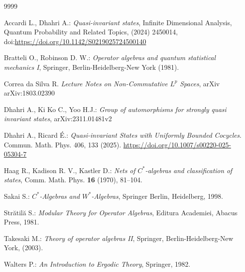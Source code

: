 \documentclass[12pt]{amsart}
\numberwithin{equation}{section}
\theoremstyle{definition}
\begin{document}
\begin{thebibliography}{9999}

 Accardi L., Dhahri A.: \emph{Quasi-invariant states}, Infinite Dimensional Analysis, Quantum Probability and Related Topics, (2024) 2450014, doi:\url{https://doi.org/10.1142/S0219025724500140}

 Bratteli O., Robinson D. W.:
{\it Operator algebras and quantum statistical mechanics I}, Springer, Berlin-Heidelberg-New York (1981).

 Correa da Silva R. \emph{Lecture Notes on Non-Commutative $L^p$ Spaces}, arXiv arXiv:1803.02390  

 Dhahri A., Ki Ko C., Yoo H.J.: \emph{Group of automorphisms for strongly quasi invariant states},  arXiv:2311.01481v2 

 Dhahri A., Ricard É.: \emph{Quasi-invariant States with Uniformly Bounded Cocycles}. Commun. Math. Phys. 406, 133 (2025). \url{https://doi.org/10.1007/s00220-025-05304-7}

  Haag R., Kadison R. V., Kastler D.: \emph{Nets of $C^*$-algebras and classification of states},
Comm. Math. Phys. \textbf{16} (1970), 81--104.

 Sakai S.: {\it $C^*$-Algebras and $W^*$-Algebras}, Springer Berlin, Heidelberg, 1998.  

 Str\u{a}til\u{a} S.: \emph{Modular Theory for Operator Algebras}, Editura Academiei, Abacus Press, 1981.

 Takesaki M.:
{\it Theory of operator algebras II}, Springer, Berlin-Heidelberg-New
York, (2003).

 Walters P.: \emph{An Introduction to Ergodic Theory}, Springer, 1982.

\end{thebibliography}
\end{document}
